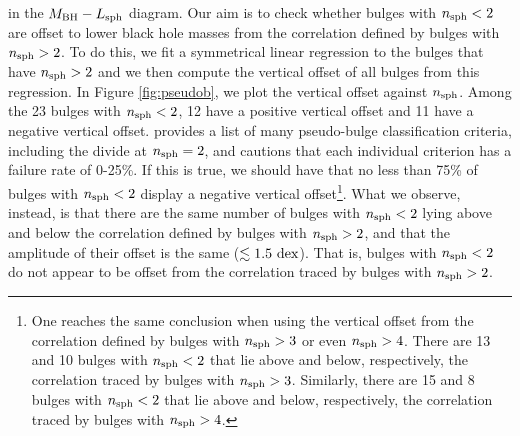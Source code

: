 \documentclass[preprint2]{emulateapj}
\begin{document}
in the $M_{\rm BH} - L_{\rm sph}$ diagram.
Our aim is to check whether bulges with $n_{\rm sph}<2$ 
are offset to lower black hole masses from the correlation defined by bulges with $n_{\rm sph}>2$. 
To do this, we fit a symmetrical linear regression to the bulges that have $n_{\rm sph}>2$ 
and we then compute the vertical offset of all bulges from this regression. 
In Figure \ref{fig:pseudob}, we plot the vertical offset against $n_{\rm sph}$. 
Among the 23 bulges with $n_{\rm sph}<2$, 12 have a positive vertical offset and 11 have a negative vertical offset. 
\cite{kormendy2015review} provides a list of many pseudo-bulge classification criteria, including the divide at $n_{\rm sph}=2$, 
and cautions that each individual criterion has a failure rate of 0-25\%. 
If this is true, we should have that no less than 75\% of bulges with $n_{\rm sph}<2$ display a negative vertical offset\footnote{One 
reaches the same conclusion when using the vertical offset from the correlation defined by bulges with $n_{\rm sph}>3$ or even $n_{\rm sph}>4$. 
There are 13 and 10 bulges with $n_{\rm sph}<2$ that lie above and below, respectively, the correlation traced by bulges with $n_{\rm sph}>3$. 
Similarly, there are 15 and 8 bulges with $n_{\rm sph}<2$ that lie above and below, respectively, the correlation traced by bulges with $n_{\rm sph}>4$.}. 
What we observe, instead, is that there are the same number of bulges with $n_{\rm sph}<2$ lying above and below 
the correlation defined by bulges with $n_{\rm sph}>2$, 
and that the amplitude of their offset is the same ($\lesssim 1.5\rm~dex$).
That is, bulges with $n_{\rm sph}<2$ do not appear to be offset from the correlation traced by bulges with $n_{\rm sph}>2$. 
\end{document}
